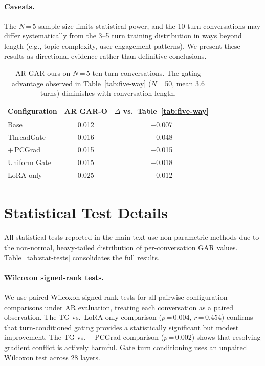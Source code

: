 \paragraph{Caveats.} The $N$\,=\,5 sample size limits statistical power, and the 10-turn conversations may differ systematically from the 3--5 turn training distribution in ways beyond length (e.g., topic complexity, user engagement patterns). We present these results as directional evidence rather than definitive conclusions.

\begin{table}[t]
\centering\small
\caption{AR GAR-ours on $N$\,=\,5 ten-turn conversations. The gating advantage observed in Table~\ref{tab:five-way} ($N$\,=\,50, mean 3.6 turns) diminishes with conversation length.}
\label{tab:n5-ar}
\begin{tabular}{lcc}
\toprule
\textbf{Configuration} & \textbf{AR GAR-O} & \textbf{$\Delta$ vs.\ Table~\ref{tab:five-way}} \\
\midrule
Base & 0.012 & $-$0.007 \\
\midrule
ThreadGate & 0.016 & $-$0.048 \\
\;+\,PCGrad & 0.015 & $-$0.015 \\
Uniform Gate & 0.015 & $-$0.018 \\
LoRA-only & 0.025 & $-$0.012 \\
\bottomrule
\end{tabular}
\end{table}

\section{Statistical Test Details}\label{sec:appendix-stats}

All statistical tests reported in the main text use non-parametric methods due to the non-normal, heavy-tailed distribution of per-conversation GAR values. Table~\ref{tab:stat-tests} consolidates the full results.

\paragraph{Wilcoxon signed-rank tests.} We use paired Wilcoxon signed-rank tests for all pairwise configuration comparisons under AR evaluation, treating each conversation as a paired observation. The TG vs.\ LoRA-only comparison ($p$\,=\,0.004, $r$\,=\,0.454) confirms that turn-conditioned gating provides a statistically significant but modest improvement. The TG vs.\ +PCGrad comparison ($p$\,=\,0.002) shows that resolving gradient conflict is actively harmful. Gate turn conditioning uses an unpaired Wilcoxon test across 28 layers.

